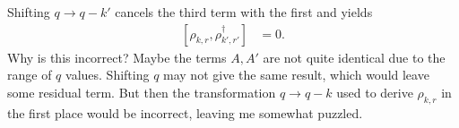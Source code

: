 \documentclass[english, parskip=full]{scrartcl}
\begin{document}
Shifting $q \rightarrow q - k'$ cancels the third term with the first and yields
\begin{align}
\left[ \rho_{k,r}, \rho^\dagger_{k',r'} \right] &= 0.
\end{align}
Why is this incorrect? 
Maybe the terms $A,A'$ are not quite identical due to the range of $q$ values. 
Shifting $q$ may not give the same result, which would leave some residual term. 
But then the transformation $q\rightarrow q-k$ used to derive $\rho_{k,r}$ in the first place would be incorrect, leaving me somewhat puzzled.

\end{document}
